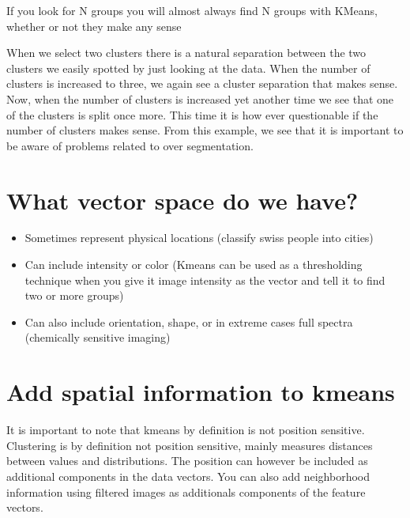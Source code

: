 \documentclass[letterpaper,10pt,english]{sphinxmanual}
\begin{document}
\noindent{}

\sphinxAtStartPar
{}  If you look for N groups you will almost always find N groups with K\sphinxhyphen{}Means, whether or not they make any sense

\sphinxAtStartPar
When we select two clusters there is a natural separation between the two clusters we easily spotted by just looking at the data. When the number of clusters is increased to three, we again see a cluster separation that makes sense. Now, when the number of clusters is increased yet another time we see that one of the clusters is split once more. This time it is how ever questionable if the number of clusters makes sense. From this example, we see that it is important to be aware of problems related to over segmentation.


\section{What vector space do we have?}
\label{\detokenize{05-AdvancedSegmentation:what-vector-space-do-we-have}}\begin{itemize}
\item {} 
\sphinxAtStartPar
Sometimes represent physical locations (classify swiss people into cities)

\item {} 
\sphinxAtStartPar
Can include intensity or color (K\sphinxhyphen{}means can be used as a thresholding technique when you give it image intensity as the vector and tell it to find two or more groups)

\item {} 
\sphinxAtStartPar
Can also include orientation, shape, or in extreme cases full spectra (chemically sensitive imaging)

\end{itemize}


\section{Add spatial information to k\sphinxhyphen{}means}
\label{\detokenize{05-AdvancedSegmentation:add-spatial-information-to-k-means}}
\sphinxAtStartPar
It is important to note that k\sphinxhyphen{}means by definition is not position sensitive. Clustering is by definition not position sensitive, mainly measures distances between values and distributions. The position can however be included as additional components in the data vectors. You can also add neighborhood information using filtered images as additionals components of the feature vectors.
\end{document}
